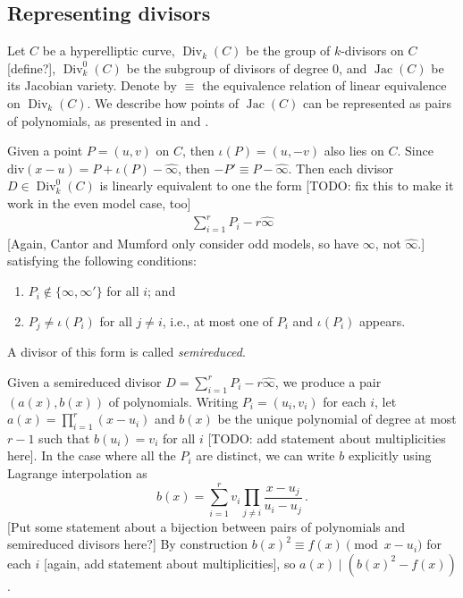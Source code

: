 \documentclass[reqno, 12pt]{amsart}
\theoremstyle{definition}
\renewcommand{\div}{\text{div}}
\newcommand{\wh}{\widehat}
\DeclareMathOperator{\Jac}{Jac}
\DeclareMathOperator{\Div}{Div}
\newcommand{\whinfty}{\wh{\infty}}
\newcommand{\sss}[1]{{\color{blue} [#1]}}
\begin{document}
\subsection{Representing divisors}
Let $C$ be a hyperelliptic curve, $\Div_k(C)$ be the group of $k$-divisors on $C$ \sss{define?}, $\Div^0_k(C)$ be the subgroup of divisors of degree $0$, and $\Jac(C)$ be its Jacobian variety. Denote by $\equiv$ the equivalence relation of linear equivalence on $\Div_k(C)$. We describe how points of $\Jac(C)$ can be represented as pairs of polynomials, as presented in \cite{Cantor} and \cite[\S1]{Mumford}.

Given a point $P = (u,v)$ on $C$, then $\iota(P) = (u,-v)$ also lies on $C$. Since $\div(x - u) = P + \iota(P) - \wh{\infty}$, then $-P' \equiv P - \wh{\infty}$. Then each divisor $D \in \Div^0_k(C)$ is linearly equivalent to one the form \sss{TODO: fix this to make it work in the even model case, too}
\begin{align} \label{semireduced}
\sum_{i=1}^r P_i - r \whinfty
\end{align}
\sss{Again, Cantor and Mumford only consider odd models, so have $\infty$, not $\whinfty$.}
satisfying the following conditions:
\begin{enumerate}
\item
$P_i \notin \{\infty, \infty'\}$ for all $i$; and

\item
$P_j \neq \iota(P_i)$ for all $j \neq i$, i.e., at most one of $P_i$ and $\iota(P_i)$ appears.
\end{enumerate}
A divisor of this form is called \textit{semireduced}.

Given  a semireduced divisor $D = \sum_{i=1}^r P_i - r \whinfty$, we produce a pair $(a(x), b(x))$ of polynomials. Writing $P_i = (u_i, v_i)$ for each $i$, let $a(x) = \prod_{i = 1}^r (x - u_i)$ and $b(x)$ be the unique polynomial of degree at most $r-1$ such that $b(u_i) = v_i$ for all $i$ \sss{TODO: add statement about multiplicities here}. In the case where all the $P_i$ are distinct, we can write $b$ explicitly using Lagrange interpolation as
$$
b(x) = \sum_{i=1}^r  v_i \prod_{j \neq i} \frac{x - u_j}{u_i - u_j} \, .
$$
\sss{Put some statement about a bijection between pairs of polynomials and semireduced divisors here?}
By construction $b(x)^2 \equiv f(x) \pmod{x - u_i}$ for each $i$ \sss{again, add statement about multiplicities}, so $a(x) \mid (b(x)^2 - f(x))$.
\end{document}
